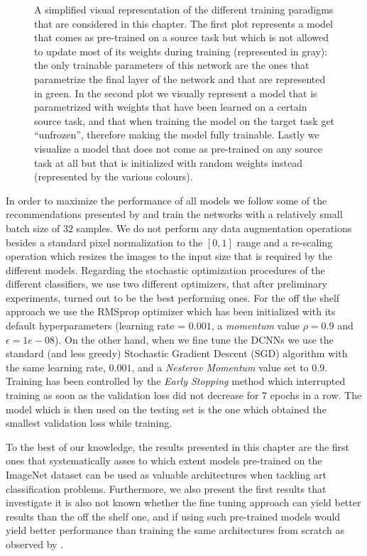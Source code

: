\begin{figure}[!htb]
\endminipage

\label{fig:network_training_approaches}
\caption{A simplified visual representation of the different training paradigms that are considered in this chapter. The first plot represents a model that comes as pre-trained on a source task but which is not allowed to update most of its weights during training (represented in gray): the only trainable parameters of this network are the ones that parametrize the final layer of the network and that are represented in green. In the second plot we visually represent a model that is parametrized with weights that have been learned on a certain source task, and that when training the model on the target task get ``unfrozen'', therefore making the model fully trainable. Lastly we visualize a model that does not come as pre-trained on any source task at all but that is initialized with random weights instead (represented by the various colours).}
\end{figure}


In order to maximize the performance of all models we follow some of the recommendations presented by \citet{masters2018revisiting} and train the networks with a relatively small batch size of $32$ samples. We do not perform any data augmentation operations besides a standard pixel normalization to the $[0, 1]$ range and a re-scaling operation which resizes the images to the input size that is required by the different models. Regarding the stochastic optimization procedures of the different classifiers, we use two different optimizers, that after preliminary experiments, turned out to be the best performing ones. For the off the shelf approach we use the RMSprop optimizer \cite{tieleman2012lecture} which has been initialized with its default hyperparameters (learning rate = $0.001$, a \textit{momentum} value $\rho = 0.9$ and $\epsilon =1e-08$). On the other hand, when we fine tune the DCNNs we use the standard (and less greedy) Stochastic Gradient Descent (SGD) algorithm with the same learning rate, $0.001$, and a \textit{Nesterov Momentum} value set to $0.9$.
Training has been controlled by the \textit{Early Stopping} method \cite{caruana2001overfitting} which interrupted training as soon as the validation loss did not decrease for $7$ epochs in a row. The model which is then used on the testing set is the one which obtained the smallest validation loss while training.

To the best of our knowledge, the results presented in this chapter are the first ones that systematically asses to which extent models pre-trained on the ImageNet dataset can be used as valuable architectures when tackling art classification problems. Furthermore, we also present the first results that investigate it is also not known whether the fine tuning approach can yield better results than the off the shelf one, and if using such pre-trained models would yield better performance than training the same architectures from scratch as observed by \citet{kornblith2018better}.

